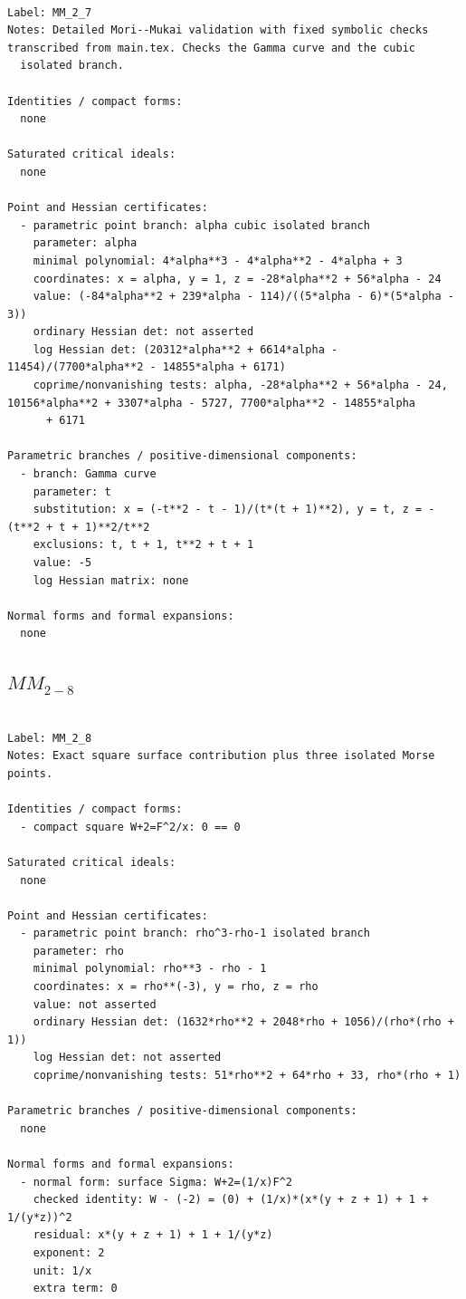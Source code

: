 \documentclass[10pt,a4paper]{article}
\begin{document}
\begin{lstlisting}

Label: MM_2_7
Notes: Detailed Mori--Mukai validation with fixed symbolic checks transcribed from main.tex. Checks the Gamma curve and the cubic
  isolated branch.

Identities / compact forms:
  none

Saturated critical ideals:
  none

Point and Hessian certificates:
  - parametric point branch: alpha cubic isolated branch
    parameter: alpha
    minimal polynomial: 4*alpha**3 - 4*alpha**2 - 4*alpha + 3
    coordinates: x = alpha, y = 1, z = -28*alpha**2 + 56*alpha - 24
    value: (-84*alpha**2 + 239*alpha - 114)/((5*alpha - 6)*(5*alpha - 3))
    ordinary Hessian det: not asserted
    log Hessian det: (20312*alpha**2 + 6614*alpha - 11454)/(7700*alpha**2 - 14855*alpha + 6171)
    coprime/nonvanishing tests: alpha, -28*alpha**2 + 56*alpha - 24, 10156*alpha**2 + 3307*alpha - 5727, 7700*alpha**2 - 14855*alpha
      + 6171

Parametric branches / positive-dimensional components:
  - branch: Gamma curve
    parameter: t
    substitution: x = (-t**2 - t - 1)/(t*(t + 1)**2), y = t, z = -(t**2 + t + 1)**2/t**2
    exclusions: t, t + 1, t**2 + t + 1
    value: -5
    log Hessian matrix: none

Normal forms and formal expansions:
  none

\end{lstlisting}

\subsection*{$ MM_{2-8} $}

\begin{lstlisting}

Label: MM_2_8
Notes: Exact square surface contribution plus three isolated Morse points.

Identities / compact forms:
  - compact square W+2=F^2/x: 0 == 0

Saturated critical ideals:
  none

Point and Hessian certificates:
  - parametric point branch: rho^3-rho-1 isolated branch
    parameter: rho
    minimal polynomial: rho**3 - rho - 1
    coordinates: x = rho**(-3), y = rho, z = rho
    value: not asserted
    ordinary Hessian det: (1632*rho**2 + 2048*rho + 1056)/(rho*(rho + 1))
    log Hessian det: not asserted
    coprime/nonvanishing tests: 51*rho**2 + 64*rho + 33, rho*(rho + 1)

Parametric branches / positive-dimensional components:
  none

Normal forms and formal expansions:
  - normal form: surface Sigma: W+2=(1/x)F^2
    checked identity: W - (-2) = (0) + (1/x)*(x*(y + z + 1) + 1 + 1/(y*z))^2
    residual: x*(y + z + 1) + 1 + 1/(y*z)
    exponent: 2
    unit: 1/x
    extra term: 0

\end{lstlisting}
\end{document}
